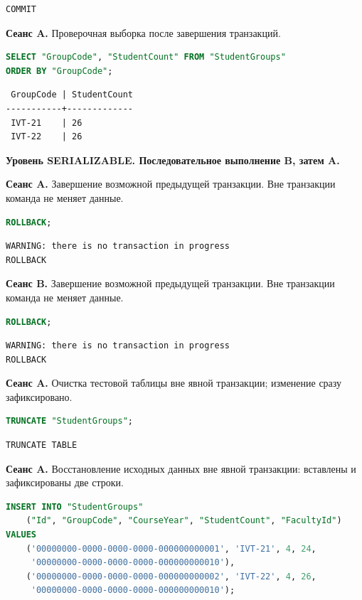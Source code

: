 \documentclass[12pt,a4paper]{article}
\begin{document}
\begin{lstlisting}
COMMIT
\end{lstlisting}

\textbf{Сеанс A.} Проверочная выборка после завершения транзакций.
\begin{lstlisting}[language=SQL]
SELECT "GroupCode", "StudentCount" FROM "StudentGroups"
ORDER BY "GroupCode";
\end{lstlisting}

\begin{lstlisting}
 GroupCode | StudentCount
-----------+-------------
 IVT-21    | 26
 IVT-22    | 26
\end{lstlisting}

\textbf{Уровень SERIALIZABLE. Последовательное выполнение B, затем A.}

\textbf{Сеанс A.} Завершение возможной предыдущей транзакции. Вне транзакции команда не меняет данные.
\begin{lstlisting}[language=SQL]
ROLLBACK;
\end{lstlisting}

\begin{lstlisting}
WARNING: there is no transaction in progress
ROLLBACK
\end{lstlisting}

\textbf{Сеанс B.} Завершение возможной предыдущей транзакции. Вне транзакции команда не меняет данные.
\begin{lstlisting}[language=SQL]
ROLLBACK;
\end{lstlisting}

\begin{lstlisting}
WARNING: there is no transaction in progress
ROLLBACK
\end{lstlisting}

\textbf{Сеанс A.} Очистка тестовой таблицы вне явной транзакции; изменение сразу зафиксировано.
\begin{lstlisting}[language=SQL]
TRUNCATE "StudentGroups";
\end{lstlisting}

\begin{lstlisting}
TRUNCATE TABLE
\end{lstlisting}

\textbf{Сеанс A.} Восстановление исходных данных вне явной транзакции: вставлены и зафиксированы две строки.
\begin{lstlisting}[language=SQL]
INSERT INTO "StudentGroups"
    ("Id", "GroupCode", "CourseYear", "StudentCount", "FacultyId")
VALUES
    ('00000000-0000-0000-0000-000000000001', 'IVT-21', 4, 24,
     '00000000-0000-0000-0000-000000000010'),
    ('00000000-0000-0000-0000-000000000002', 'IVT-22', 4, 26,
     '00000000-0000-0000-0000-000000000010');
\end{lstlisting}
\end{document}
